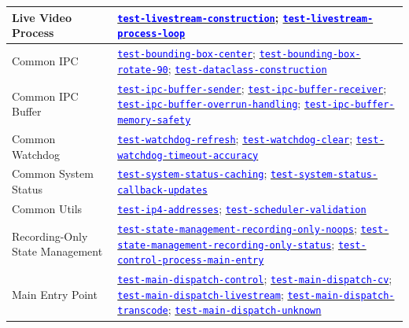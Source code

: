 \documentclass[12pt, titlepage]{article}
\newcommand{\tid}[1]{\hyperlink{tid:#1}{\textcolor{blue}{\texttt{#1}}}}
\begin{document}
\begin{longtable}{|p{4.5cm}|p{10cm}|}
  \hline
  Live Video Process              & \tid{test-livestream-construction}; \tid{test-livestream-process-loop}                                                                                                                                                                                                                    \\
  \hline
  Common IPC                      & \tid{test-bounding-box-center}; \tid{test-bounding-box-rotate-90}; \tid{test-dataclass-construction}                                                                                                                                                                                      \\
  \hline
  Common IPC Buffer               & \tid{test-ipc-buffer-sender}; \tid{test-ipc-buffer-receiver}; \tid{test-ipc-buffer-overrun-handling}; \tid{test-ipc-buffer-memory-safety}                                                                                                                                                 \\
  \hline
  Common Watchdog                 & \tid{test-watchdog-refresh}; \tid{test-watchdog-clear}; \tid{test-watchdog-timeout-accuracy}                                                                                                                                                                                              \\
  \hline
  Common System Status            & \tid{test-system-status-caching}; \tid{test-system-status-callback-updates}                                                                                                                                                                                                               \\
  \hline
  Common Utils                    & \tid{test-ip4-addresses}; \tid{test-scheduler-validation}                                                                                                                                                                                                                                 \\
  \hline
  Recording-Only State Management & \tid{test-state-management-recording-only-noops}; \tid{test-state-management-recording-only-status}; \tid{test-control-process-main-entry}                                                                                                                                                \\
  \hline
  Main Entry Point                & \tid{test-main-dispatch-control}; \tid{test-main-dispatch-cv}; \tid{test-main-dispatch-livestream}; \tid{test-main-dispatch-transcode}; \tid{test-main-dispatch-unknown}                                                                                                                  \\

\end{longtable}
\end{document}
